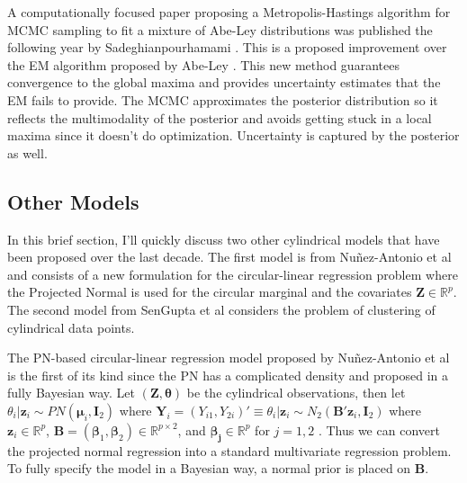 
A computationally focused paper proposing a Metropolis-Hastings algorithm for MCMC sampling to fit a mixture of Abe-Ley distributions was published the following year by Sadeghianpourhamami \cite{sadeghianpourhamami_bayesian_2019}. This is a proposed improvement over the EM algorithm proposed by Abe-Ley \cite{abe_tractable_2017}. This new method guarantees convergence to the global maxima and provides uncertainty estimates that the EM fails to provide. The MCMC approximates the posterior distribution so it reflects the multimodality of the posterior and avoids getting stuck in a local maxima since it doesn't do optimization. Uncertainty is captured by the posterior as well. 

\subsection{Other Models}\label{mod_other}

In this brief section, I'll quickly discuss two other cylindrical models that have been proposed over the last decade. The first model is from Nu\~{n}ez-Antonio et al \cite{nunez-antonio_bayesian_2011} and consists of a new formulation for the circular-linear regression problem where the Projected Normal is used for the circular marginal and the covariates $\mathbf{Z} \in \mathbb{R}^p$. The second model from SenGupta et al \cite{noauthor_model-based_nodate} considers the problem of clustering of cylindrical data points. 

The PN-based circular-linear regression model proposed by Nu\~{n}ez-Antonio et al \cite{nunez-antonio_bayesian_2011} is the first of its kind since the PN has a complicated density and proposed in a fully Bayesian way. Let $(\mathbf{Z}, \bm{\theta})$ be the cylindrical observations, then let $\theta_i | \mathbf{z}_i \sim PN(\bm{\mu}_i, \mathbf{I}_2)$ where $\mathbf{Y}_i = (Y_{i1}, Y_{2i})' \equiv \theta_i | \mathbf{z}_i \sim N_2(\mathbf{B}' \mathbf{z}_i, \mathbf{I}_2)$ where $\mathbf{z}_i \in \mathbb{R}^p$, $\mathbf{B} = (\bm{\beta}_1, \bm{\beta}_2) \in \mathbb{R}^{p \times 2}$, and $\bm{\beta_j} \in \mathbb{R}^p$ for $j = 1,2$ \cite{nunez-antonio_bayesian_2011}. Thus we can convert the projected normal regression into a standard multivariate regression problem. To fully specify the model in a Bayesian way, a normal prior is placed on $\mathbf{B}$. 

